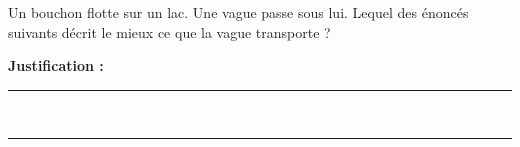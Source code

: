 Un bouchon flotte sur un lac. Une vague passe sous lui. Lequel des énoncés suivants décrit le mieux ce que la vague transporte ?

\choices

\noindent\textbf{Justification :} \hrulefill \\[2.5ex]
\rule{\linewidth}{0.4pt} \\[2.5ex]
\rule{\linewidth}{0.4pt}
\vfill
